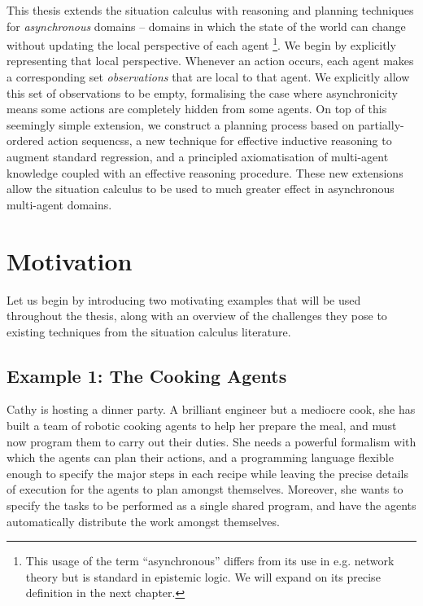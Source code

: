 This thesis extends the situation calculus with reasoning and planning
techniques for \emph{asynchronous }domains -- domains in which the
state of the world can change without updating the local perspective
of each agent%
\footnote{This usage of the term {}``asynchronous'' differs from its use in
e.g. network theory but is standard in epistemic logic. We will expand
on its precise definition in the next chapter. %
}. We begin by explicitly representing that local perspective. Whenever
an action occurs, each agent makes a corresponding set \emph{observations}
that are local to that agent. We explicitly allow this set of observations
to be empty, formalising the case where asynchronicity means some
actions are completely hidden from some agents. On top of this seemingly
simple extension, we construct a planning process based on partially-ordered
action sequencss, a new technique for effective inductive reasoning
to augment standard regression, and a principled axiomatisation of
multi-agent knowledge coupled with an effective reasoning procedure.
These new extensions allow the situation calculus to be used to much
greater effect in asynchronous multi-agent domains.


\section{Motivation}

Let us begin by introducing two motivating examples that will be used
throughout the thesis, along with an overview of the challenges they
pose to existing techniques from the situation calculus literature.


\subsection*{Example 1: The Cooking Agents}

Cathy is hosting a dinner party. A brilliant engineer but a mediocre
cook, she has built a team of robotic cooking agents to help her prepare
the meal, and must now program them to carry out their duties. She
needs a powerful formalism with which the agents can plan their actions,
and a programming language flexible enough to specify the major steps
in each recipe while leaving the precise details of execution for
the agents to plan amongst themselves. Moreover, she wants to specify
the tasks to be performed as a single shared program, and have the
agents automatically distribute the work amongst themselves.\\


